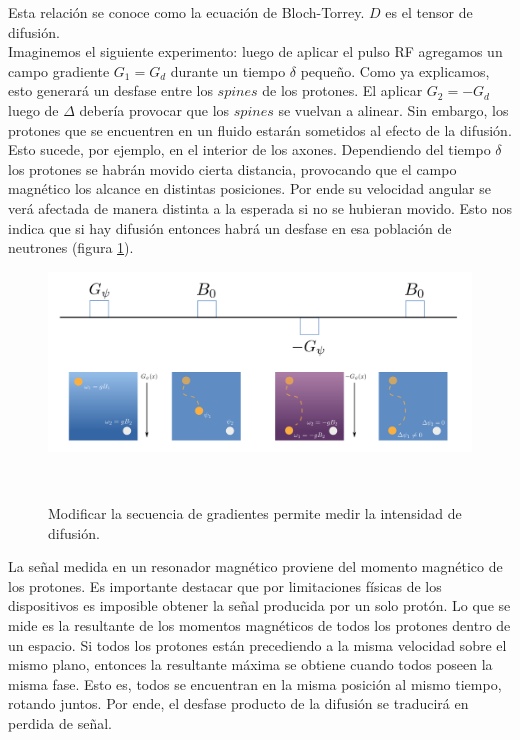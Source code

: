 Esta relaci\'on se conoce como la ecuaci\'on de Bloch-Torrey. $D$ es el tensor de difusi\'on. \\

Imaginemos el siguiente experimento: luego de aplicar el pulso RF 
agregamos un campo gradiente $G_1=G_d$ durante un tiempo $\delta$ 
peque\~no. Como ya explicamos, esto generar\'a un desfase entre los $spines$
de los protones. El aplicar $G_2=-G_d$ luego de $\Delta$ deber\'ia
provocar que los $spines$ se vuelvan a alinear. Sin embargo, los protones
que se encuentren en un fluido estar\'an sometidos al efecto de la 
difusi\'on. Esto sucede, por ejemplo, en el interior de los axones.
Dependiendo del tiempo $\delta$ los protones se habr\'an movido cierta
distancia, provocando que el campo magn\'etico los alcance en distintas 
posiciones. Por ende su velocidad angular se ver\'a afectada de manera 
distinta a la esperada si no se hubieran movido. Esto nos indica que si
hay difusi\'on entonces habr\'a un desfase en esa poblaci\'on de neutrones
(figura \ref{fig:dmri}).\\

\begin{figure}
                                                                                                                        
\begin{minipage}[b]{\textwidth}
    \includegraphics[width=\textwidth]{img/dmri.png}
    \caption{Modificar la secuencia de gradientes permite medir la
             intensidad de difusi\'on.}
    \label{fig:dmri}
\end{minipage} ~

\end{figure}  

La se\~nal medida en un resonador magn\'etico proviene del 
momento magn\'etico de los protones. Es importante destacar que por
limitaciones f\'isicas de los
dispositivos es imposible obtener la se\~nal producida por un
solo prot\'on. Lo que se mide es la resultante de los momentos magn\'eticos
de todos los protones dentro de un espacio. Si todos los protones est\'an
precediendo a la misma velocidad sobre el mismo plano, entonces la
resultante m\'axima se obtiene cuando todos poseen la misma fase. Esto es,
todos se encuentran en la misma posici\'on al mismo tiempo, rotando
juntos. Por ende, el desfase producto de la difusi\'on se traducir\'a en
perdida de se\~nal.\\

